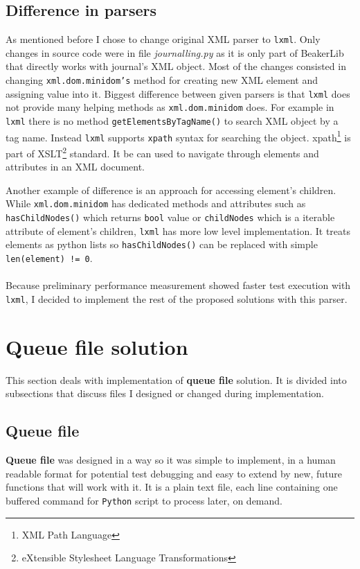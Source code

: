\subsection{Difference in parsers}
As mentioned before I chose to change original XML parser to \texttt{lxml}. Only changes in source code were in file \textit{journalling.py} as it is only part of BeakerLib that directly works with journal's XML object. 
Most of the changes consisted in changing \texttt{xml.dom.minidom's} method for creating new XML element and assigning value into it.
Biggest difference between given parsers is that \texttt{lxml} does not provide many helping methods as \texttt{xml.dom.minidom} does.
For example in \texttt{lxml}  there is no method \texttt{getElementsByTagName()} to search XML object by a tag name. Instead \texttt{lxml} supports \texttt{xpath} \cite{xpath} syntax for searching the object. xpath\footnote{XML Path Language} is part of XSLT\footnote{eXtensible Stylesheet Language Transformations} standard. It be can used to navigate through elements and attributes in an XML document.

Another example of difference is an approach for accessing element's children. While \texttt{xml.dom.minidom} has dedicated methods and attributes such as \texttt{hasChildNodes()} which returns \texttt{bool} value or \texttt{childNodes} which is a iterable attribute of element's children, \texttt{lxml} has more low level implementation. It treats elements as python lists so \texttt{hasChildNodes()} can be replaced with simple \texttt{len(element) != 0}.
\\
\\
Because preliminary performance measurement showed faster test execution with \texttt{lxml}, I decided to implement the rest of the proposed solutions with this parser.

\section{Queue file solution}
This section deals with implementation of \textbf{queue file} solution. It is divided into subsections that discuss files I designed or changed during implementation. 

\subsection{Queue file}
\textbf{Queue file} was designed in a way so it was simple to implement, in a human readable format for potential test debugging and easy to extend by new, future functions that will work with it. 
It is a plain text file, each line containing one buffered command for \texttt{Python} script to process later, on demand. 

